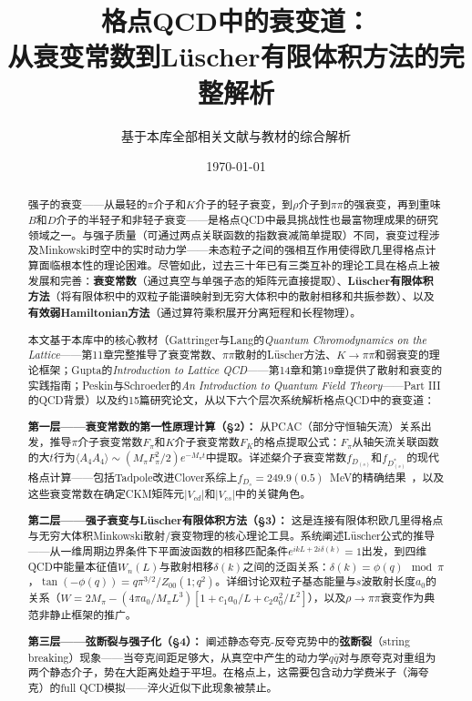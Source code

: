 \documentclass[12pt,a4paper]{ctexart}
\title{\heiti 格点QCD中的衰变道：\\
从衰变常数到L\"uscher有限体积方法的完整解析}
\author{基于本库全部相关文献与教材的综合解析}
\date{\today}
\theoremstyle{definition}
\begin{document}
\maketitle

\begin{abstract}
\noindent
强子的衰变——从最轻的$\pi$介子和$K$介子的轻子衰变，到$\rho$介子到$\pi\pi$的强衰变，再到重味$B$和$D$介子的半轻子和非轻子衰变——是格点QCD中最具挑战性也最富物理成果的研究领域之一。与强子质量（可通过两点关联函数的指数衰减简单提取）不同，衰变过程涉及Minkowski时空中的实时动力学——未态粒子之间的强相互作用使得欧几里得格点计算面临根本性的理论困难。尽管如此，过去三十年已有三类互补的理论工具在格点上被发展和完善：\textbf{衰变常数}（通过真空与单强子态的矩阵元直接提取）、\textbf{L\"uscher有限体积方法}（将有限体积中的双粒子能谱映射到无穷大体积中的散射相移和共振参数）、以及\textbf{有效弱Hamiltonian方法}（通过算符乘积展开分离短程和长程物理）。

本文基于本库中的核心教材（Gattringer与Lang的\textit{Quantum Chromodynamics on the Lattice}——第11章完整推导了衰变常数、$\pi\pi$散射的L\"uscher方法、$K\to\pi\pi$和弱衰变的理论框架；Gupta的\textit{Introduction to Lattice QCD}——第14章和第19章提供了散射和衰变的实践指南；Peskin与Schroeder的\textit{An Introduction to Quantum Field Theory}——Part III的QCD背景）以及约15篇研究论文，从以下六个层次系统解析格点QCD中的衰变道：

\textbf{第一层——衰变常数的第一性原理计算（§2）：}
从PCAC（部分守恒轴矢流）关系出发，推导$\pi$介子衰变常数$F_\pi$和$K$介子衰变常数$F_K$的格点提取公式：$F_\pi$从轴矢流关联函数的大$t$行为$\langle A_4 A_4\rangle \sim (M_\pi F_\pi^2/2) e^{-M_\pi t}$中提取。详述粲介子衰变常数$f_{D_{(s)}}$和$f_{D_{(s)}^*}$的现代格点计算——包括Tadpole改进Clover系综上$f_{D_s} = 249.9(0.5)$~MeV的精确结果~\cite{CharmedClover}，以及这些衰变常数在确定CKM矩阵元$|V_{cd}|$和$|V_{cs}|$中的关键角色。

\textbf{第二层——强子衰变与L\"uscher有限体积方法（§3）：}
这是连接有限体积欧几里得格点与无穷大体积Minkowski散射/衰变物理的核心理论工具。系统阐述L\"uscher公式的推导——从一维周期边界条件下平面波函数的相移匹配条件$e^{ikL+2i\delta(k)} = 1$出发，到四维QCD中能量本征值$W_n(L)$与散射相移$\delta(k)$之间的泛函关系：$\delta(k) = \phi(q) \mod \pi$，$\tan(-\phi(q)) = q\pi^{3/2}/Z_{00}(1;q^2)$。详细讨论双粒子基态能量与$s$波散射长度$a_0$的关系（$W = 2M_\pi - (4\pi a_0/M_\pi L^3)[1 + c_1 a_0/L + c_2 a_0^2/L^2]$），以及$\rho\to\pi\pi$衰变作为典范非静止框架的推广。

\textbf{第三层——弦断裂与强子化（§4）：}
阐述静态夸克-反夸克势中的\textbf{弦断裂}（string breaking）现象——当夸克间距足够大，从真空中产生的动力学$q\bar{q}$对与原夸克对重组为两个静态介子，势在大距离处趋于平坦。在格点上，这需要包含动力学费米子（海夸克）的full QCD模拟——淬火近似下此现象被禁止。


\end{abstract}
\end{document}
